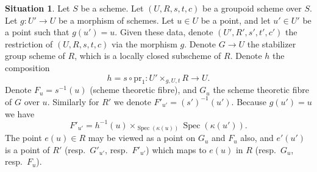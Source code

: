 \documentclass[10pt,a4paper]{amsart}
\theoremstyle{plain}
\theoremstyle{definition}
\newtheorem{situation}[subsection]{Situation}
\theoremstyle{remark}
\numberwithin{equation}{subsection}
\def\Spec{\mathop{\mathrm{Spec}}}
\begin{document}
\begin{situation}
\label{situation-slice}
Let $S$ be a scheme.
Let $(U, R, s, t, c)$ be a groupoid scheme over $S$.
Let $g : U' \to U$ be a morphism of schemes.
Let $u \in U$ be a point, and let $u' \in U'$ be a point such that
$g(u') = u$. Given these data, denote $(U', R', s', t', c')$
the restriction of $(U, R, s, t, c)$ via the morphism $g$.
Denote $G \to U$ the stabilizer group scheme of $R$, which
is a locally closed subscheme of $R$.
Denote $h$ the composition
$$
h = s \circ \text{pr}_1 : U' \times_{g, U, t} R \longrightarrow U.
$$
Denote $F_u = s^{-1}(u)$ (scheme theoretic fibre), and $G_u$ the
scheme theoretic fibre of $G$ over $u$.
Similarly for $R'$ we denote $F'_{u'} = (s')^{-1}(u')$.
Because $g(u') = u$ we have
$$
F'_{u'} = h^{-1}(u) \times_{\Spec(\kappa(u))} \Spec(\kappa(u')).
$$
The point $e(u) \in R$ may be viewed as a point on $G_u$ and $F_u$ also, and
$e'(u')$ is a point of $R'$ (resp.\ $G'_{u'}$, resp.\ $F'_{u'}$) which maps
to $e(u)$ in $R$ (resp.\ $G_u$, resp.\ $F_u$).
\end{situation}
\end{document}
